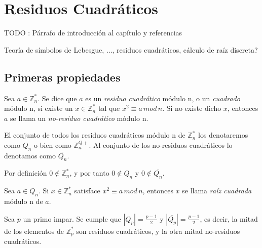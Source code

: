 \chapter{Residuos Cuadráticos}\label{ch:qr} 

TODO : Párrafo de introducción al capítulo y referencias

Teoría de símbolos de Lebesgue, ..., residuos cuadráticos, cálculo de raíz discreta?



\section{Primeras propiedades}

\begin{definition}
	Sea $a\in \mathbb{Z}^*_n$. Se dice que $a$ es un \textit{residuo cuadrático} módulo n, o un \textit{cuadrado} módulo n, si existe un $x \in \mathbb{Z}^*_n$ tal que $x^2 \equiv a \, mod \, n$.
	Si no existe dicho $x$, entonces $a$ se llama un \textit{no-residuo cuadrático} módulo n.
	
	El conjunto de todos los residuos cuadráticos módulo n de $\mathbb{Z}^*_n$ los denotaremos como $Q_n$ o bien como $\mathbb{Z}^{Q+}_n$.
	Al conjunto de los no-residuos cuadráticos lo denotamos como $\overline{Q_n}$.
\end{definition}


\begin{remark}
	Por definición $0 \notin \mathbb{Z}^*_n$, y por tanto $0 \notin Q_n$ y $0 \notin \overline{Q_n}$.
\end{remark}



\begin{definition}
	Sea $a \in Q_n$. Si $x \in \mathbb{Z}^*_n$ satisface $ x^2 \equiv a \, mod \, n$, entonces $x$ se llama \textit{raíz cuadrada} módulo n de $a$.
\end{definition}



\begin{proposition}
	Sea $p$ un primo impar. Se cumple que $|Q_p| = \frac{p-1}{2}$ y $|\overline{Q_p}| = \frac{p-1}{2}$, es decir, la mitad de los elementos de $\mathbb{Z}^*_p$ son residuos cuadráticos, y la otra mitad no-residuos cuadráticos.
\end{proposition}

